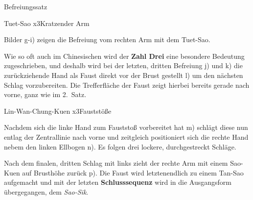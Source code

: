 \begin{WTSatz}{Befreiungssatz}
\begin{WTSatzTeil}{Tuet-Sao x3}{Kratzender Arm}
		
		Bilder g-i) zeigen die Befreiung vom rechten Arm mit dem Tuet-Sao.
		

		Wie so oft auch im Chinesischen wird der \textbf{Zahl Drei} eine besondere Bedeutung zugeschrieben, und deshalb wird bei der letzten, dritten Befreiung j) und k) die zur\"uckziehende Hand als Faust direkt vor der Brust gestellt l) um den n\"achsten Schlag vorzubereiten. Die Trefferfl\"ache der Faust zeigt hierbei bereits gerade nach vorne, ganz wie im 2.~Satz.
		
	\end{WTSatzTeil}
	\begin{WTSatzTeil}{Lin-Wan-Chung-Kuen x3}{Faustst\"o{\ss}e}
	
		
		
		Nachdem sich die linke Hand zum Fauststo{\ss} vorbereitet hat m) schl\"agt diese nun entlag der Zentrallinie nach vorne und zeitgleich positioniert sich die rechte Hand nebem den linken Ellbogen n). Es folgen drei lockere, durchgestreckt Schl\"age.
		
		
		Nach dem finalen, dritten Schlag mit links zieht der rechte Arm mit einem Sao-Kuen auf Brusth\"ohe zur\"uck p). Die Faust wird letztenendlich zu einem Tan-Sao aufgemacht und mit der letzten \textbf{Schlusssequenz} wird in die Ausgangsform \"ubergegangen, dem \textit{Sao-Sik}.

	\end{WTSatzTeil}
\end{WTSatz}
